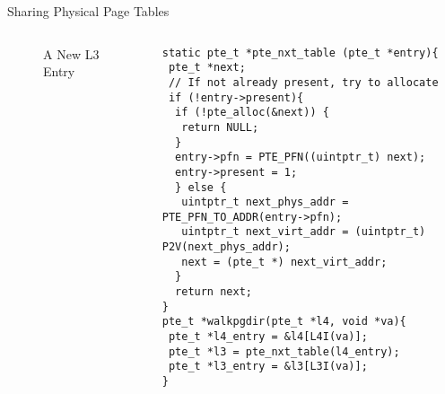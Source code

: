 \documentclass[aspectratio=169,xcolor=dvipsnames]{beamer}
\begin{document}
\begin{frame}[fragile]{Sharing Physical Page Tables}
\begin{columns}[c]
\begin{figure}
\begin{tikzpicture}[x=0.75pt,y=0.75pt,yscale=-0.5,xscale=0.5]
\end{tikzpicture}
        \caption{A New L3 Entry}
        \label{fig:enter-label}
    \end{figure}
\begin{lstlisting}[style=CStyleNum, basicstyle=\tiny]
static pte_t *pte_nxt_table (pte_t *entry){
 pte_t *next;
 // If not already present, try to allocate
 if (!entry->present){
  if (!pte_alloc(&next)) {
   return NULL;
  }
  entry->pfn = PTE_PFN((uintptr_t) next);
  entry->present = 1;
  } else {
   uintptr_t next_phys_addr = PTE_PFN_TO_ADDR(entry->pfn);        
   uintptr_t next_virt_addr = (uintptr_t) P2V(next_phys_addr);
   next = (pte_t *) next_virt_addr;
  }
  return next;
}   
pte_t *walkpgdir(pte_t *l4, void *va){ 
 pte_t *l4_entry = &l4[L4I(va)];
 pte_t *l3 = pte_nxt_table(l4_entry);
 pte_t *l3_entry = &l3[L3I(va)];
}

\end{lstlisting}
\end{columns}
\end{frame}
\end{document}
